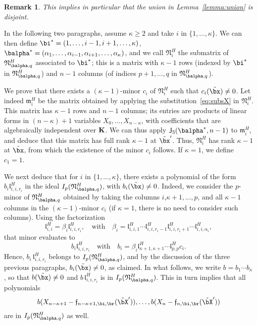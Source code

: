 \documentclass[12pt]{article}
\newtheorem{remark}[definition]{Remark}
\begin{document}
\begin{remark}\label{remark:disjoint}
  This implies in particular that the union in Lemma~\ref{lemma:union} is disjoint.
\end{remark}

In the following two paragraphs, assume $\kappa \ge 2$
and take $i$ in $\{1,\dots,\kappa\}$. We can then define
$\bi^*=(1,\dots,i-1,i+1,\dots,\kappa)$,
$\balpha^*=(\alpha_1,\dots,\alpha_{i-1},\alpha_{i+1},\dots,\alpha_\kappa)$,
and we call $\mathfrak{N}^H_i$ the submatrix of
$\mathfrak{N}^H_{\balpha,q}$ associated to $\bi^*$; this is a matrix
with $\kappa-1$ rows (indexed by $\bi^*$ in
$\mathfrak{N}^H_{\balpha,q}$) and $n-1$ columns (of indices $p+1,\dots,q$ 
in $\mathfrak{N}^H_{\balpha,q}$).

We prove that there exists a $(\kappa-1)$-minor $c_i$ of
$\mathfrak{N}^H_i$ such that $c_i(\tilde\bx)\ne 0$.  Let indeed
$\mathfrak{m}^H_i$ be the matrix obtained by applying the
substitution~\eqref{eq:subsX} in $\mathfrak{N}^H_i$. This matrix 
has $\kappa-1$ rows and $n-1$ columns; its entries are products of
linear forms in $(n-\kappa)+1$ variables $X_0,\dots,X_{n-\kappa}$,
with coefficients that are algebraically
independent over $\mathbf{K}$. We can thus apply $\assI_3(\balpha^*,n-1)$ to
$\mathfrak{m}_{i}^H$, and deduce that this matrix has full rank $\kappa-1$
at $\tilde\bx'$.  Thus, $\mathfrak{N}^H_i$ has rank $\kappa-1$ at
$\tilde\bx$, from which the existence of the minor $c_i$ follows.
If $\kappa=1$, we define $c_1=1$.

We next deduce that for $i$ in $\{1,\dots,\kappa\}$, there exists a
polynomial of the form $b_{i} \mathfrak{l}^H_{i,i,r_i}$ in the ideal
$I_p(\mathfrak{N}^H_{\balpha,q})$, with $b_{i}(\tilde\bx)\ne
0$. Indeed, we consider the $p$-minor of $\mathfrak{N}^H_{\balpha,q}$
obtained by taking the columns $i$,$\kappa+1,\dots,p$, and all
$\kappa-1$ columns in the $(\kappa-1)$-minor $c_i$ (if $\kappa=1$,
there is no need to consider such columns). Using the factorization
$$\mathfrak{l}^H_{i,i} = \beta_i \mathfrak{l}^H_{i,i,r_i},\quad\text{with}\quad
\beta_i=\mathfrak{l}^H_{i,i,1}\cdots \mathfrak{l}^H_{i,i,r_i-1}\mathfrak{l}^H_{i,i,r_i+1}\cdots \mathfrak{l}^H_{i,i,\alpha_i},$$
that minor evaluates to 
$$b_i \mathfrak{l}^H_{i,i,r_i}\quad\text{with}\quad b_i = \beta_i
\mathfrak{l}^H_{\kappa+1,\kappa+1}\cdots \mathfrak{l}^H_{p,p}c_i.$$ Hence, $b_i\,
\mathfrak{l}^H_{i,i,r_i}$ belongs to $I_p(\mathfrak{N}^H_{\balpha,q})$, and by
the discussion of the three previous paragraphs, $b_i(\tilde\bx)\ne 0$,
as claimed. In what follows, we write $b=b_1 \cdots b_\kappa$,
so that $b(\tilde\bx) \ne 0$ and $b\, \mathfrak{l}^H_{i,i,r_i}$ 
is in $I_p(\mathfrak{N}^H_{\balpha,q})$. 
This in turn implies
that all polynomials
$$
b(X_{n-\kappa+1}-\mathfrak{f}_{n-\kappa+1,\bi,\br}(\tilde\bX')),\dots,b(X_{n}-\mathfrak{f}_{n,\bi,\br}(\tilde\bX'))
$$ are in $I_p(\mathfrak{N}^H_{\balpha,q})$ as well.
\end{document}
